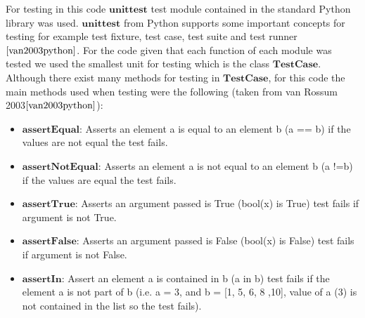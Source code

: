 For testing in this code $\textbf{unittest}$ test module contained in the standard Python library was used. $\textbf{unittest}$ from Python supports some important concepts for testing for example test fixture, test case, test suite and test runner $\cite{van2003python}$. For the code given that each function of each module was tested we used the smallest unit for testing which is the class $\textbf{TestCase}$. Although there exist many methods for testing in $\textbf{TestCase}$,  for this code the main methods used when testing were the following (taken from van Rossum 2003$\cite{van2003python}$):

\begin{itemize}
	\item $\textbf{assertEqual:}$ Asserts an element a is equal to an element  b (a == b) if the values are not equal the test fails.
	\item $\textbf{assertNotEqual:}$ Asserts an element a is not equal to an element b (a !=b) if the values are equal the test fails.
	\item $\textbf{assertTrue:}$ Asserts an argument passed is True (bool(x) is True) test fails if argument is not True. 
	\item $\textbf{assertFalse:}$ Asserts an argument passed is False (bool(x) is False) test fails if argument is not False.
	\item $\textbf{assertIn:}$ Assert an element a is contained in b (a in b) test fails if the element a is not part of b (i.e. a = 3, and b = [1, 5, 6, 8 ,10], value of a (3) is not contained in the list so the test fails).
\end{itemize}

